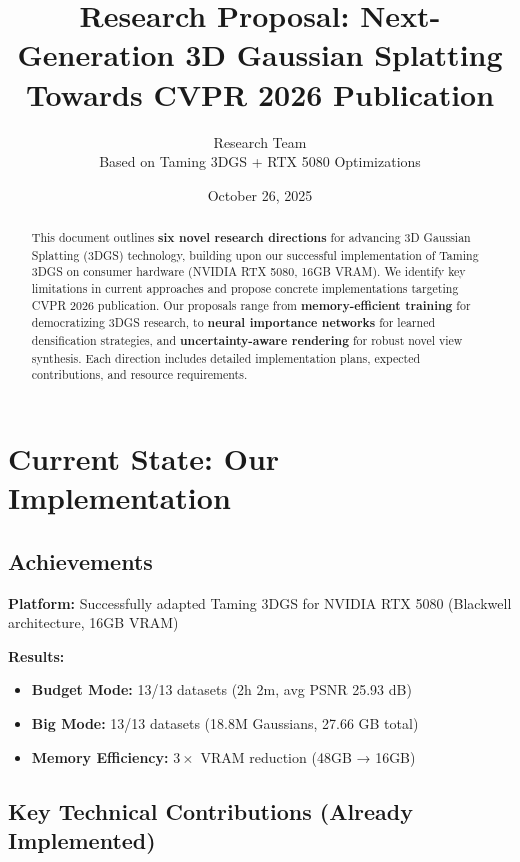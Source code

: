 \documentclass[11pt,letterpaper]{article}
\title{\textbf{Research Proposal: Next-Generation 3D Gaussian Splatting} \\
\large Towards CVPR 2026 Publication}
\author{Research Team \\ Based on Taming 3DGS + RTX 5080 Optimizations}
\date{October 26, 2025}
\begin{document}
\maketitle

\begin{abstract}
This document outlines \textbf{six novel research directions} for advancing 3D Gaussian Splatting (3DGS) technology, building upon our successful implementation of Taming 3DGS on consumer hardware (NVIDIA RTX 5080, 16GB VRAM). We identify key limitations in current approaches and propose concrete implementations targeting CVPR 2026 publication. Our proposals range from \textbf{memory-efficient training} for democratizing 3DGS research, to \textbf{neural importance networks} for learned densification strategies, and \textbf{uncertainty-aware rendering} for robust novel view synthesis. Each direction includes detailed implementation plans, expected contributions, and resource requirements.
\end{abstract}

\section{Current State: Our Implementation}

\subsection{Achievements}

\textbf{Platform:} Successfully adapted Taming 3DGS for NVIDIA RTX 5080 (Blackwell architecture, 16GB VRAM)

\textbf{Results:}
\begin{itemize}[leftmargin=*]
    \item \textbf{Budget Mode:} 13/13 datasets (2h 2m, avg PSNR 25.93 dB)
    \item \textbf{Big Mode:} 13/13 datasets (18.8M Gaussians, 27.66 GB total)
    \item \textbf{Memory Efficiency:} $3\times$ VRAM reduction (48GB → 16GB)
\end{itemize}

\subsection{Key Technical Contributions (Already Implemented)}
\end{document}
